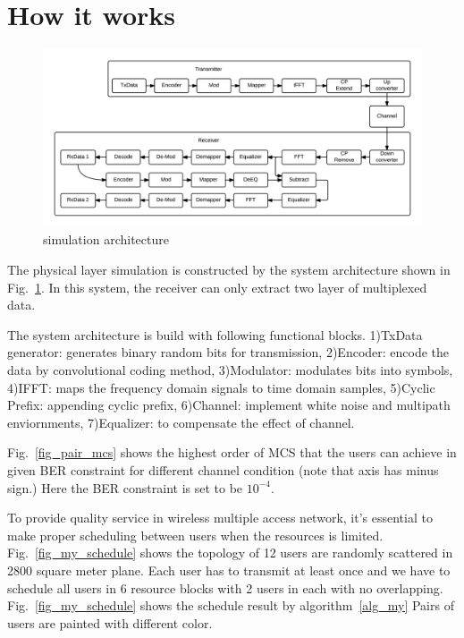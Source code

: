 \section{How it works}
\label{sec_how_it_works}

\begin{figure}[t]
\begin{center}
\includegraphics[width=1.0\columnwidth ,angle=0]{figure/systemArch.png}
\caption{simulation architecture}
\label{fig_sys_arch}
\end{center}
\end{figure}

The physical layer simulation is constructed by the system architecture 
shown in Fig.~\ref{fig_sys_arch}.
In this system, the receiver can only extract two layer of multiplexed data.

The system architecture is build with following functional blocks. 1)TxData 
generator: generates binary random bits for transmission, 2)Encoder: encode 
the data by convolutional coding method, 3)Modulator: modulates bits into
symbols, 4)IFFT: maps the frequency domain signals to time domain samples,
5)Cyclic Prefix: appending cyclic prefix, 6)Channel: implement white noise
and multipath enviornments, 7)Equalizer: to compensate the effect of channel.

Fig.~\ref{fig_pair_mcs} shows the highest order of MCS that the users can
achieve in given BER constraint for different channel condition (note that
axis has minus sign.) Here the BER constraint is set to be $10^{-4}$.

To provide quality service in wireless multiple access
network, it’s essential to make proper scheduling between users
when the resources is limited.
Fig.~\ref{fig_my_schedule} shows the topology of
12 users are randomly scattered in 2800 square meter plane.
Each user has to transmit at least once and we have to schedule all users 
in 6 resource blocks with 2 users in each with no overlapping.
Fig.~\ref{fig_my_schedule} shows the schedule result by algorithm~\ref{alg_my}
Pairs of users are painted with different color.

